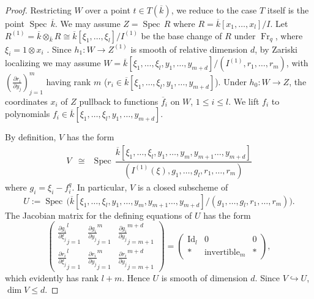 \documentclass[reqno]{amsart}
\numberwithin{equation}{section}
\newcommand{\pderiv}[2]{\frac{\partial #1}{\partial #2}}
\DeclareMathOperator{\Frob}{Fr}
\DeclareMathOperator{\Spec}{Spec\,}
\DeclareMathOperator{\Id}{Id}
\newcommand{\incl}{\hookrightarrow}
\newcommand{\ov}{\overline}
\newcommand\ot{\otimes}
\theoremstyle{remark}
\numberwithin{equation}{section}
\begin{document}
\begin{proof} Restricting $W$ over a point $t\in T(\ov{k})$, we reduce to the case $T$ itself is the point $\Spec\ov{k}$. We may assume $Z=\Spec R$ where $R=\ov k[x_{1},\ldots, x_{l}]/I$. Let $R^{(1)}=\ov k\ot_{\ov k}R\cong \ov k[\xi_{1},\ldots, \xi_{l}]/I^{(1)}$ be the base change of $R$ under $\Frob_{q}$, where $\xi_{i}=1\ot x_{i}$ . Since $h_{1}: W\to Z^{(1)}$ is smooth of relative dimension $d$,  by Zariski localizing we may assume $W=\ov k[\xi_{1},\ldots, \xi_{l}, y_{1},\ldots, y_{m+d}]/(I^{(1)}, r_{1},\ldots, r_{m})$,  with $(\pderiv{r_i}{y_j})_{j=1}^m$ having rank $m$ ($r_{i}\in \ov k[\xi_{1},\ldots, \xi_{l}, y_{1},\ldots, y_{m+d}]$). Under $h_{0}: W\to Z$, the coordinates $x_{i}$ of $Z$ pullback to functions $\ov f_{i}$ on $W$, $1\le i\le l$. We lift $f_{i}$ to polynomials $f_{i}\in \ov k[\xi_{1},\ldots, \xi_{l}, y_{1},\ldots, y_{m+d}]$. 

By definition, $V$ has the form 
\begin{eqnarray*}
V & \cong&  \Spec\dfrac{ \ov k[\xi_{1},\ldots, \xi_{l}, y_1, \ldots, y_m, y_{m+1} \ldots, y_{m+d}  ]}
{(I^{(1)}(\xi), g_{1},\ldots, g_{l}, r_1, \ldots, r_m)}
\end{eqnarray*}
where $g_{i}=\xi_{i}-f_{i}^{q}$. In particular,  $V$ is a closed subscheme of 
\begin{equation}
U:=\Spec\Big( \ov k[\xi_{1},\ldots, \xi_{l}, y_1, \ldots, y_m, y_{m+1} \ldots, y_{m+d}  ]/ (g_{1},\ldots, g_{l}, r_1, \ldots, r_m)\Big).
\end{equation}
The Jacobian matrix for the defining equations of $U$ has the form 
\[
\begin{pmatrix}
\boxed{\pderiv{g_i}{\xi_j}}_{j=1}^l  & \boxed{\pderiv{g_i}{y_j}}_{j=1}^m & \boxed{\pderiv{g_i}{y_j}}_{j=m+1}^{m+d}  \\
\boxed{\pderiv{r_i}{\xi_j}}_{j=1}^l  & \boxed{\pderiv{r_i}{y_j}}_{j=1}^m & \boxed{\pderiv{r_i}{y_j}}_{j=m+1}^{m+d} 
\end{pmatrix} = \begin{pmatrix} \Id_l & 0 &  0 \\ * & \text{invertible}_m & *  \end{pmatrix},
\]
which evidently has rank $l+m$. Hence $U$ is smooth of dimension $d$. Since $V\incl U$, $\dim V\le d$.
\end{proof}
\end{document}
